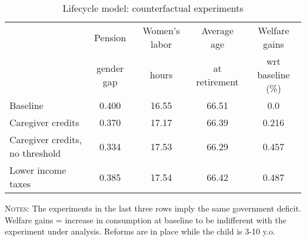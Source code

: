 \begin{table}[htbp]\begin{threeparttable}\caption{Lifecycle model: counterfactual experiments}\label{table:experiments}\centering\footnotesize\begin{tabular}{lcccc} \toprule & Pension &  Women's labor & Average age &  Welfare gains  \\&gender gap &hours &  at retirement  & wrt baseline (\%)  \\\midrule    Baseline                                   &0.400&16.55&66.51& 0.0\\ Caregiver credits                          &0.370&17.17&66.39&0.216\\ Caregiver credits, no threshold            &0.334&17.53&66.29&0.457\\ Lower income taxes                         &0.385&17.54&66.42&0.487\\ \bottomrule\end{tabular}\begin{tablenotes}[flushleft]\small\item \textsc{Notes:} The experiments in the last three rows imply the same government deficit. Welfare gains = increase in consumption at baseline to be indifferent with the experiment under analysis. Reforms are in place while the child is 3-10 y.o.\\\end{tablenotes}\end{threeparttable}\end{table}